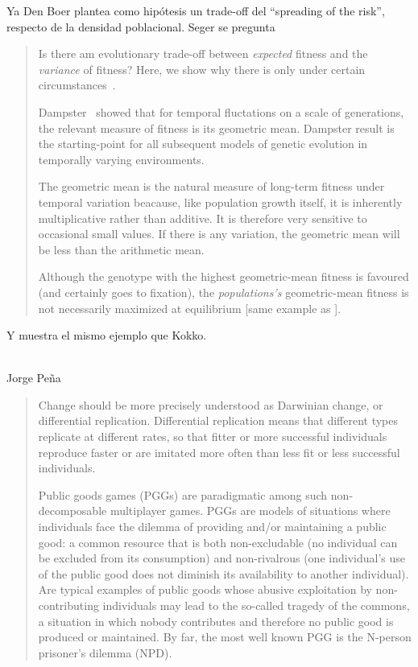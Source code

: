 \documentclass[a4paper,10pt]{article}
\begin{document}
Ya Den Boer plantea como hipótesis un trade-off del ``spreading of the risk'', respecto de la densidad poblacional.
Seger se pregunta
\begin{quotation}
    Is there am evolutionary trade-off between \emph{expected} fitness and the \emph{variance} of fitness?
    Here, we show why there is only under certain circumstances~\cite{seger1987-betHedging}.

    Dampster~\cite{dempster1955-geometricMean} showed that for temporal fluctations on a scale of generations, the relevant measure of fitness is its geometric mean.
    Dampster result is the starting-point for all subsequent models of genetic evolution in temporally varying environments.

    The geometric mean is the natural measure of long-term fitness under temporal variation beacause, like population growth itself, it is inherently multiplicative rather than additive.
    It is therefore very sensitive to occasional small values.
    If there is any variation, the geometric mean will be less than the arithmetic mean.

    Although the genotype with the highest geometric-mean fitness is favoured (and certainly goes to fixation), the \emph{populations's} geometric-mean fitness is not necessarily maximized at equilibrium [same example as \cite{starrfelt2012-bet}].
\end{quotation}
Y muestra el mismo ejemplo que Kokko.

\\

Jorge Peña
\begin{quotation}
    Change should be more precisely understood as Darwinian change, or differential replication.
    Differential replication means that different types replicate at different rates, so that fitter or more successful individuals reproduce faster or are imitated more often than less fit or less successful individuals.

    Public goods games (PGGs) are paradigmatic among such non-decomposable multiplayer games.
    PGGs are models of situations where individuals face the dilemma of providing and/or maintaining a public good: a common resource that is both non-excludable (no individual can be excluded from its consumption) and non-rivalrous (one individual’s use of the public good does not diminish its availability to another individual).
    Are typical examples of public goods whose abusive exploitation by non-contributing individuals may lead to the so-called tragedy of the commons, a situation in which nobody contributes and therefore no public good is produced or maintained.
    By far, the most well known PGG is the N-person prisoner’s dilemma (NPD). \cite{pena2012-phd}
\end{quotation}
\end{document}
